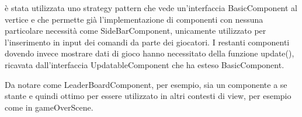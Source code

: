 è stata utilizzata uno strategy pattern che vede un'interfaccia BasicComponent al vertice e che permette già l'implementazione di componenti con nessuna particolare necessità come SideBarComponent, unicamente utilizzato per l'inserimento in input dei comandi da parte dei giocatori. I restanti componenti dovendo invece mostrare dati di gioco hanno necessitato della funzione update(), ricavata dall'interfaccia UpdatableComponent che ha esteso BasicComponent.

Da notare come LeaderBoardComponent, per esempio, sia un componente a se stante e quindi ottimo per essere utilizzato in altri contesti di view, per esempio come in gameOverScene.
\clearpage


